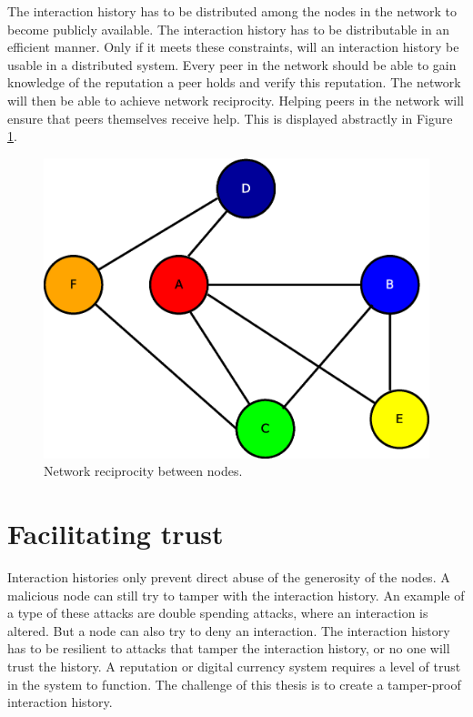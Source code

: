 The interaction history has to be distributed among the nodes in the network
to become publicly available.
The interaction history has to be distributable in an efficient manner.
Only if it meets these constraints, will an interaction history be usable in a distributed system.
Every peer in the network should be able to gain knowledge of the reputation a peer holds and verify this reputation.
The network will then be able to achieve network reciprocity\cite{Nowak-Cooperation}.
Helping peers in the network will ensure that peers themselves receive help.
This is displayed abstractly in Figure \ref{fig:network-reciprocity}.

\begin{figure}
	\centerline{\includegraphics[scale=0.3]{problemDescription/figs/network-reciprocity.eps}}
	\caption{Network reciprocity between nodes.}
	\label{fig:network-reciprocity}
\end{figure}

\section{Facilitating trust}
Interaction histories only prevent direct abuse of the generosity of the nodes.
A malicious node can still try to tamper with the interaction history.
An example of a type of these attacks are double spending attacks\cite{Nakamoto-bitcoin},
where an interaction is altered.
But a node can also try to deny an interaction.
The interaction history has to be resilient to attacks that tamper the interaction history, 
or no one will trust the history. 
A reputation or digital currency system requires a level of trust in the system to function.
The challenge of this thesis is to create a tamper-proof interaction history.

